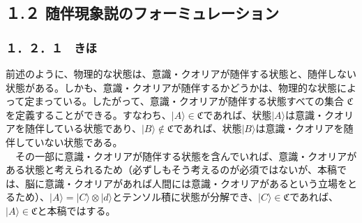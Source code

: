 \subsection{１.２ 随伴現象説のフォーミュレーション}
\subsubsection{１．２．１　きほ}
前述のように、物理的な状態は、意識・クオリアが随伴する状態と、随伴しない状態がある。しかも、意識・クオリアが随伴するかどうかは、物理的な状態によって定まっている。したがって、意識・クオリアが随伴する状態すべての集合 $\mathfrak{C}$ を定義することができる。すなわち、$|A\rangle\in\mathfrak{C}$であれば、状態$|A\rangle$は意識・クオリアを随伴している状態であり、$|B\rangle\notin\mathfrak{C}$であれば、状態$|B\rangle$は意識・クオリアを随伴していない状態である。\\
　その一部に意識・クオリアが随伴する状態を含んでいれば、意識・クオリアがある状態と考えられるため（必ずしもそう考えるのが必須ではないが、本稿では、脳に意識・クオリアがあれば人間には意識・クオリアがあるという立場をとるため）、$|A\rangle = |C\rangle\otimes |d\rangle$とテンソル積に状態が分解でき、$|C\rangle\in\mathfrak{C}$であれば、$|A\rangle\in\mathfrak{C}$と本稿ではする。